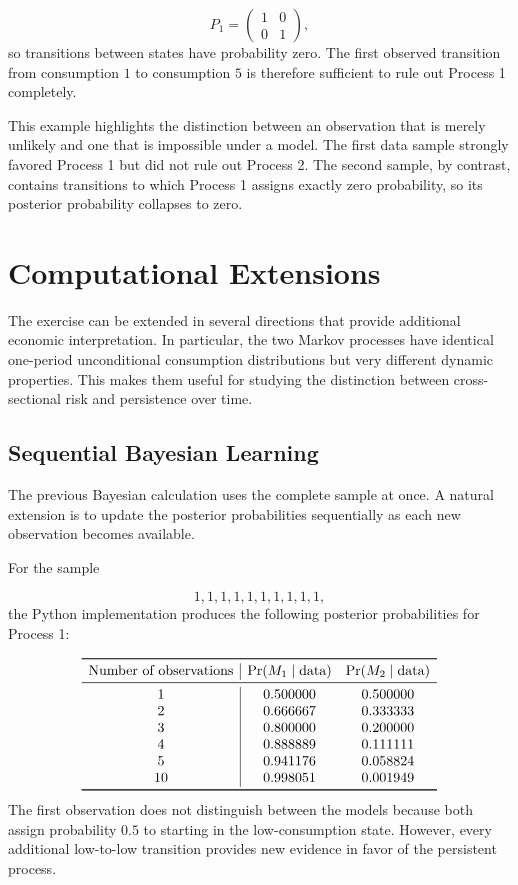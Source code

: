 \documentclass[11pt]{article}
\begin{document}
\[
P_1=
\begin{pmatrix}
1&0\\
0&1
\end{pmatrix},
\]
so transitions between states have probability zero. The first observed
transition from consumption $1$ to consumption $5$ is therefore sufficient to
rule out Process 1 completely.

This example highlights the distinction between an observation that is merely
unlikely and one that is impossible under a model. The first data sample strongly
favored Process 1 but did not rule out Process 2. The second sample, by contrast,
contains transitions to which Process 1 assigns exactly zero probability, so its
posterior probability collapses to zero.

\section*{Computational Extensions}

The exercise can be extended in several directions that provide additional
economic interpretation. In particular, the two Markov processes have identical
one-period unconditional consumption distributions but very different dynamic
properties. This makes them useful for studying the distinction between
cross-sectional risk and persistence over time.

\subsection*{Sequential Bayesian Learning}

The previous Bayesian calculation uses the complete sample at once. A natural
extension is to update the posterior probabilities sequentially as each new
observation becomes available.

For the sample

\[
1,1,1,1,1,1,1,1,1,1,
\]
the Python implementation produces the following posterior probabilities for
Process 1:

\[
\begin{array}{c|cc}
\toprule
\text{Number of observations} &
\Pr(M_1\mid\text{data}) &
\Pr(M_2\mid\text{data})\\
\midrule
1  & 0.500000 & 0.500000\\
2  & 0.666667 & 0.333333\\
3  & 0.800000 & 0.200000\\
4  & 0.888889 & 0.111111\\
5  & 0.941176 & 0.058824\\
10 & 0.998051 & 0.001949\\
\bottomrule
\end{array}
\]
The first observation does not distinguish between the models because both
assign probability $0.5$ to starting in the low-consumption state. However,
every additional low-to-low transition provides new evidence in favor of the
persistent process.
\end{document}
